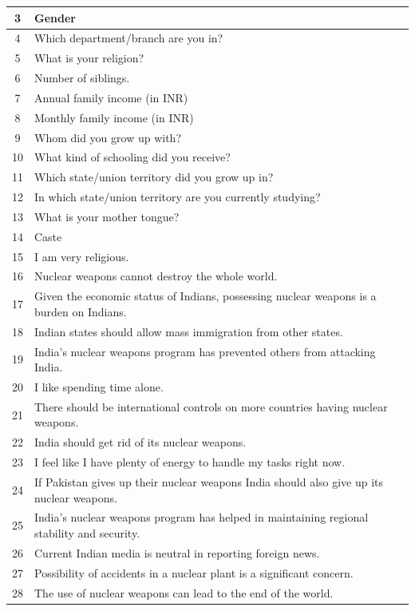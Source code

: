 \documentclass[12pt,a4paper]{article}
\begin{document}
\begin{longtable}{|c|p{12cm}|}
3 & Gender \\ \hline
4 & Which department/branch are you in? \\ \hline
5 & What is your religion? \\ \hline
6 & Number of siblings. \\ \hline
7 & Annual family income (in INR) \\ \hline
8 & Monthly family income (in INR) \\ \hline
9 & Whom did you grow up with? \\ \hline
10 & What kind of schooling did you receive? \\ \hline
11 & Which state/union territory did you grow up in? \\ \hline
12 & In which state/union territory are you currently studying? \\ \hline
13 & What is your mother tongue? \\ \hline
14 & Caste \\ \hline
15 & I am very religious. \\ \hline
16 & Nuclear weapons cannot destroy the whole world. \\ \hline
17 & Given the economic status of Indians, possessing nuclear weapons is a burden on Indians. \\ \hline
18 & Indian states should allow mass immigration from other states. \\ \hline
19 & India's nuclear weapons program has prevented others from attacking India. \\ \hline
20 & I like spending time alone. \\ \hline
21 & There should be international controls on more countries having nuclear weapons. \\ \hline
22 & India should get rid of its nuclear weapons. \\ \hline
23 & I feel like I have plenty of energy to handle my tasks right now. \\ \hline
24 & If Pakistan gives up their nuclear weapons India should also give up its nuclear weapons. \\ \hline
25 & India's nuclear weapons program has helped in maintaining regional stability and security. \\ \hline
26 & Current Indian media is neutral in reporting foreign news. \\ \hline
27 & Possibility of accidents in a nuclear plant is a significant concern. \\ \hline
28 & The use of nuclear weapons can lead to the end of the world. \\ \hline

\end{longtable}
\end{document}
